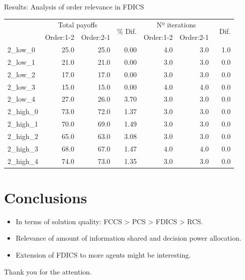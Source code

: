 \documentclass[aspectratio=169]{beamer}
\begin{document}
\begin{frame}{Results: Analysis of order relevance in FDICS}

\begin{table}[ht!]
\centering
\begin{adjustbox}{max width=\textwidth}
\begin{tabular}{lrrrrrr}
\toprule
{} & \multicolumn{2}{c}{Total payoffs} & \multirow{2}{*}{\% Dif.} & \multicolumn{2}{c}{Nº iterations} & \multirow{2}{*}{\ Dif.} \\
{} &  Order:1-2 &  Order:2-1 &       &  Order:1-2 &  Order:2-1 & \\
\midrule
2\_low\_0  &           25.0 &           25.0 &  0.00 &        4.0 &        3.0 &     1.0 \\
2\_low\_1  &           21.0 &           21.0 &  0.00 &        3.0 &        3.0 &     0.0 \\
2\_low\_2  &           17.0 &           17.0 &  0.00 &        3.0 &        3.0 &     0.0 \\
2\_low\_3  &           15.0 &           15.0 &  0.00 &        4.0 &        4.0 &     0.0 \\
2\_low\_4  &           27.0 &           26.0 &  3.70 &        3.0 &        3.0 &     0.0 \\
2\_high\_0 &           73.0 &           72.0 &  1.37 &        3.0 &        3.0 &     0.0 \\
2\_high\_1 &           70.0 &           69.0 &  1.49 &        3.0 &        3.0 &     0.0 \\
2\_high\_2 &           65.0 &           63.0 &  3.08 &        3.0 &        3.0 &     0.0 \\
2\_high\_3 &           68.0 &           67.0 &  1.47 &        4.0 &        4.0 &     0.0 \\
2\_high\_4 &           74.0 &           73.0 &  1.35 &        3.0 &        3.0 &     0.0 \\
\bottomrule
\end{tabular}
\end{adjustbox}
\end{table}
\end{frame}


\section{Conclusions}

\begin{frame}{\secname}
\begin{itemize}
\setlength\itemsep{1em}
\item<1-> In terms of solution quality: FCCS > PCS > \alert{FDICS > RCS}.
\item<2-> Relevance of amount of information shared and decision power allocation.
\item<3-> Extension of FDICS to more agents might be interesting.
\end{itemize}
\end{frame}

\begin{frame}[noframenumbering]
\begin{center}
  \Large{Thank you for the attention.}
\end{center}
\end{frame}
\end{document}
